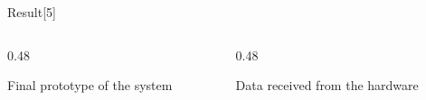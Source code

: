\begin{frame}{Result[5]}
    \begin{columns}[t, onlytextwidth]
        \begin{column}{0.48\textwidth}
            \begin{center}
            \end{center}
            Final prototype of the system
        \end{column}
        \begin{column}{0.48\textwidth}
            \begin{center}
            \end{center}
            Data received from the hardware
        \end{column}
    \end{columns}
\end{frame}
